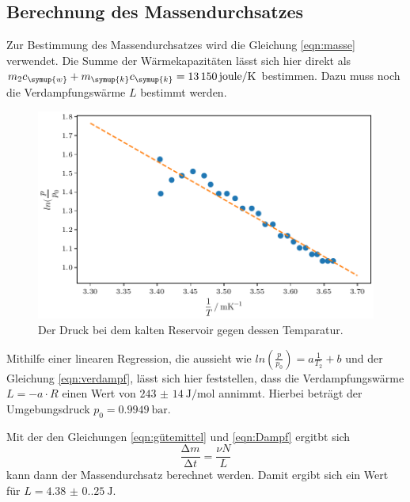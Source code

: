  \subsection{Berechnung des Massendurchsatzes}

Zur Bestimmung des Massendurchsatzes wird die Gleichung \ref{eqn:masse} verwendet. Die Summe der Wärmekapazitäten lässt sich hier 
direkt als $m_2c_{\symup{w}}+m_{\symup{k}}c_{\symup{k}}=\qty{13150}{joule\per\kelvin}$ bestimmen. Dazu muss noch die Verdampfungswärme
$L$ bestimmt werden.

\begin{figure}
    \centering
    \includegraphics{verdampfplot.pdf}
    \caption{Der Druck bei dem kalten Reservoir gegen dessen Temparatur.}
    \label{fig:druckkalt}
\end{figure}

Mithilfe einer linearen Regression, die aussieht wie $ln(\frac{p}{p_0})=a\frac{1}{T_2}+b$ und der Gleichung \ref{eqn:verdampf},
lässt sich hier feststellen, dass die Verdampfungswärme $L=-a \cdot R$ einen Wert von $\qty{243(14)}{\joule\per\mole}$ annimmt.
Hierbei beträgt der Umgebungsdruck $p_0=\qty{0.9949}{\bar}$. \cite{pDortmund}

Mit der den Gleichungen \ref{eqn:gütemittel} und \ref{eqn:Dampf} ergitbt sich 
\begin{equation*}
  \frac{\increment m}{\increment t}=\frac{\nu N}{L}
\end{equation*}
kann dann der Massendurchsatz berechnet werden.
Damit ergibt sich ein Wert für $L=\qty{4.38(0.25)}{\joule}$.


